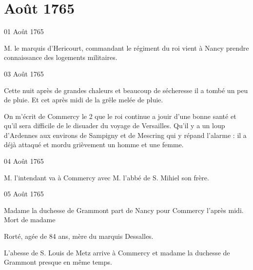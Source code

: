                   \chapter*{Août 1765}



                     \begin{diary}{01 Août 1765}{}


                           M. le marquis d'Hericourt, commandant le
                           régiment du roi vient à Nancy
                           prendre
                           connaissance des logements militaires. \bigskip


                     \end{diary}

                     \begin{diary}{03 Août 1765}{}

                         Cette nuit après de grandes chaleurs
                           et beaucoup de sécheresse il a tombé un
                           peu de pluie. Et cet après midi de la grêle
                           melée de pluie. \bigskip


                         On m'écrit de Commercy
                           le 2 que le
                              roi continue a jouir d'une bonne santé
                           et qu'il sera difficile de le disuader du
                           voyage de Versailles. Qu'il
                           y a un loup
                           d'Ardennes aux environs de Sampigny et
                           de Mescring qui y répand l'alarme : il a
                           déjà attaqué et mordu grièvement un homme
                           et une femme. \bigskip


                     \end{diary}

                     \begin{diary}{04 Août 1765}{}


                           M. l'intendant va à Commercy avec M.
                              l'abbé de S. Mihiel son frère. \bigskip


                     \end{diary}

                     \begin{diary}{05 Août 1765}{}


                           Madame la duchesse de Grammont part de
                           Nancy pour Commercy l'après midi.
                           Mort de madame

                              Rorté, agée de 84 ans, mère du marquis Dessalles. \bigskip



                           L'abesse de S. Louis de Metz
                           arrive à Commercy
                           et madame la duchesse de Grammont presque en
                           même temps. \bigskip


                     \end{diary}

